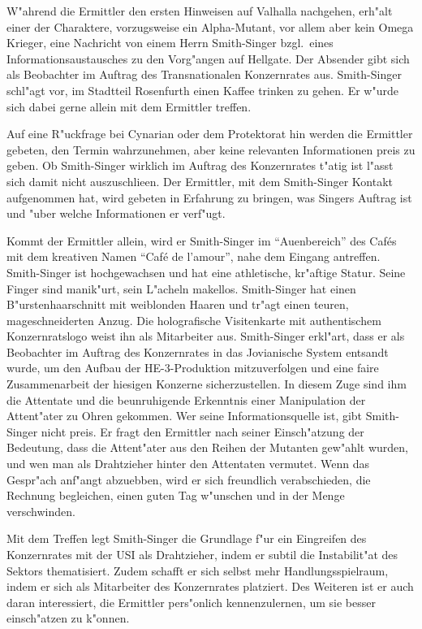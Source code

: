 
W"ahrend die Ermittler den ersten Hinweisen auf Valhalla nachgehen, erh"alt einer der Charaktere, vorzugsweise ein Alpha-Mutant, vor allem aber kein Omega Krieger, eine Nachricht von einem Herrn Smith-Singer bzgl.~eines Informationsaustausches zu den Vorg"angen auf Hellgate. Der Absender gibt sich als Beobachter im Auftrag des Transnationalen Konzernrates aus. Smith-Singer schl"agt vor, im Stadtteil Rosenfurth einen Kaffee trinken zu gehen. Er w"urde sich dabei gerne allein mit dem Ermittler treffen. 

Auf eine R"uckfrage bei Cynarian oder dem Protektorat hin werden die Ermittler gebeten, den Termin wahrzunehmen, aber keine relevanten Informationen preis zu geben. Ob Smith-Singer wirklich im Auftrag des Konzernrates t"atig ist l"asst sich damit nicht auszuschlie\3en. Der Ermittler, mit dem Smith-Singer Kontakt aufgenommen hat, wird gebeten in Erfahrung zu bringen, was Singers Auftrag ist und "uber welche Informationen er verf"ugt. 

Kommt der Ermittler allein, wird er Smith-Singer im "`Au\3enbereich"' des Caf\'es mit dem kreativen Namen "`Caf\'e de l'amour"', nahe dem Eingang antreffen. Smith-Singer ist hochgewachsen und hat eine athletische, kr"aftige Statur. Seine Finger sind manik"urt, sein L"acheln makellos. Smith-Singer hat einen B"urstenhaarschnitt mit wei\3blonden Haaren und tr"agt einen teuren, ma\3geschneiderten Anzug. Die holografische Visitenkarte mit authentischem Konzernratslogo weist ihn als Mitarbeiter aus. Smith-Singer erkl"art, dass er als Beobachter im Auftrag des Konzernrates in das Jovianische System entsandt wurde, um den Aufbau der HE-3-Produktion mitzuverfolgen und eine faire Zusammenarbeit der hiesigen Konzerne sicherzustellen. In diesem Zuge sind ihm die Attentate und die beunruhigende Erkenntnis einer Manipulation der Attent"ater zu Ohren gekommen. Wer seine Informationsquelle ist, gibt Smith-Singer nicht preis. Er fragt den Ermittler nach seiner Einsch"atzung der Bedeutung, dass die Attent"ater aus den Reihen der Mutanten gew"ahlt wurden, und wen man als Drahtzieher hinter den Attentaten vermutet. Wenn das Gespr"ach anf"angt abzuebben, wird er sich freundlich verabschieden, die Rechnung begleichen, einen guten Tag w"unschen und in der Menge verschwinden.

Mit dem Treffen legt Smith-Singer die Grundlage f"ur ein Eingreifen des Konzernrates mit der USI als Drahtzieher, indem er subtil die Instabilit"at des Sektors thematisiert. Zudem schafft er sich selbst mehr Handlungsspielraum, indem er sich als Mitarbeiter des Konzernrates platziert. Des Weiteren ist er auch daran interessiert, die Ermittler pers"onlich kennenzulernen, um sie besser einsch"atzen zu k"onnen.

